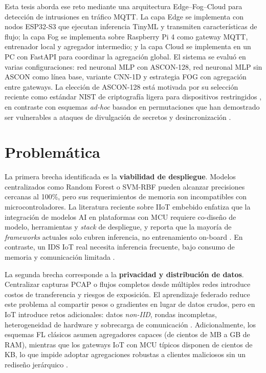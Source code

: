 Esta tesis aborda ese reto mediante una arquitectura Edge--Fog--Cloud para detección de intrusiones en tráfico MQTT. La capa Edge se implementa con nodos ESP32-S3 que ejecutan inferencia TinyML y transmiten características de flujo; la capa Fog se implementa sobre Raspberry Pi 4 como gateway MQTT, entrenador local y agregador intermedio; y la capa Cloud se implementa en un PC con FastAPI para coordinar la agregación global. El sistema se evaluó en varias configuraciones: red neuronal MLP con ASCON-128, red neuronal MLP sin ASCON como línea base, variante CNN-1D y estrategia FOG con agregación entre gateways. La elección de ASCON-128 está motivada por su selección reciente como estándar NIST de criptografía ligera para dispositivos restringidos \cite{NISTSP8002322025, Kaur2025_ASCON_Survey}, en contraste con esquemas \emph{ad-hoc} basados en permutaciones que han demostrado ser vulnerables a ataques de divulgación de secretos y desincronización \cite{Mirzaali2025_LWC_Permutations}.

\section{Problemática}

La primera brecha identificada es la \textbf{viabilidad de despliegue}. Modelos centralizados como Random Forest o SVM-RBF pueden alcanzar precisiones cercanas al 100\%, pero sus requerimientos de memoria son incompatibles con microcontroladores. La literatura reciente sobre IIoT embebido enfatiza que la integración de modelos AI en plataformas con MCU requiere co-diseño de modelo, herramientas y \emph{stack} de despliegue, y reporta que la mayoría de \emph{frameworks} actuales solo cubren inferencia, no entrenamiento on-board \cite{Dini2024_EmbeddedIIoT_Review, Ficco2024_FL_TinyML_Onboard}. En contraste, un IDS IoT real necesita inferencia frecuente, bajo consumo de memoria y comunicación limitada \cite{Tekin2023_OnDeviceEnergy, Amuthadevi2025}.

La segunda brecha corresponde a la \textbf{privacidad y distribución de datos}. Centralizar capturas PCAP o flujos completos desde múltiples redes introduce costos de transferencia y riesgos de exposición. El aprendizaje federado reduce este problema al compartir pesos o gradientes en lugar de datos crudos, pero en IoT introduce retos adicionales: datos \textit{non-IID}, rondas incompletas, heterogeneidad de hardware y sobrecarga de comunicación \cite{Imteaj2022_FL_ResourceConstrainedSurvey, Albanbay2025, Ramadan2025}. Adicionalmente, los esquemas FL clásicos asumen agregadores capaces (de cientos de MB a GB de RAM), mientras que los gateways IoT con MCU típicos disponen de cientos de KB, lo que impide adoptar agregaciones robustas a clientes maliciosos sin un rediseño jerárquico \cite{Tran2026_EdgeTrustShard}.

